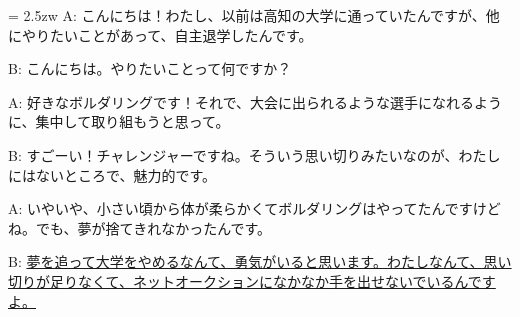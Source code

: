 \documentclass[11pt]{amsart}
\title{}
\author{}
\newenvironment{hangall}[1]{\hangindent = 2.5zw\everypar{\hangindent = 2.5zw}}{}
\begin{document}
\maketitle
\begin{hangall}{}%
A: こんにちは！わたし、以前は高知の大学に通っていたんですが、他にやりたいことがあって、自主退学したんです。

B: こんにちは。やりたいことって何ですか？

A: 好きなボルダリングです！それで、大会に出られるような選手になれるように、集中して取り組もうと思って。

B: すごーい！チャレンジャーですね。そういう思い切りみたいなのが、わたしにはないところで、魅力的です。

A: いやいや、小さい頃から体が柔らかくてボルダリングはやってたんですけどね。でも、夢が捨てきれなかったんです。

B: \ul{夢を追って大学をやめるなんて、勇気がいると思います。わたしなんて、思い切りが足りなくて、ネットオークションになかなか手を出せないでいるんですよ。}\end{hangall}
\end{document}
